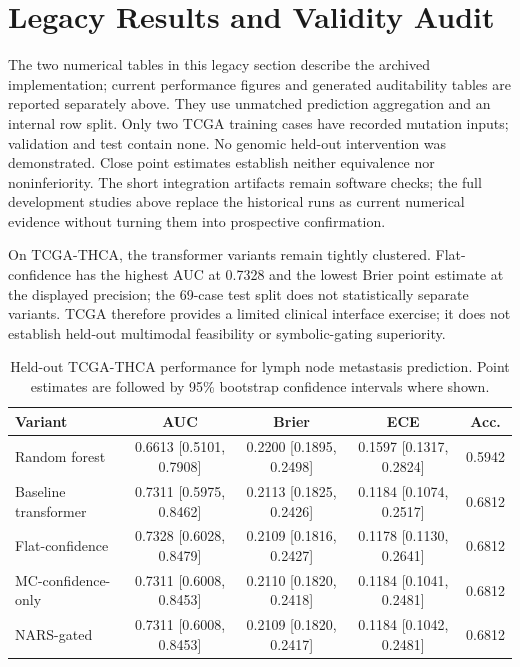 \section{Legacy Results and Validity Audit}
\label{sec:results}

The two numerical tables in this legacy section describe the archived implementation; current performance figures and generated auditability tables are reported separately above. They use unmatched prediction aggregation and an internal row split. Only two TCGA training cases have recorded mutation inputs; validation and test contain none. No genomic held-out intervention was demonstrated. Close point estimates establish neither equivalence nor noninferiority. The short integration artifacts remain software checks; the full development studies above replace the historical runs as current numerical evidence without turning them into prospective confirmation.

On TCGA-THCA, the transformer variants remain tightly clustered. Flat-confidence has the highest AUC at 0.7328 and the lowest Brier point estimate at the displayed precision; the 69-case test split does not statistically separate variants. TCGA therefore provides a limited clinical interface exercise; it does not establish held-out multimodal feasibility or symbolic-gating superiority.

\begin{table}[t]
\caption{Held-out TCGA-THCA performance for lymph node metastasis prediction. Point estimates are followed by 95\% bootstrap confidence intervals where shown.}
\label{tab:tcga_results}
\centering
\scriptsize
\setlength{\tabcolsep}{2.5pt}
\begin{tabular}{@{}lcccc@{}}
\toprule
Variant & AUC & Brier & ECE & Acc. \\
\midrule
Random forest & 0.6613 [0.5101, 0.7908] & 0.2200 [0.1895, 0.2498] & 0.1597 [0.1317, 0.2824] & 0.5942 \\
Baseline transformer & 0.7311 [0.5975, 0.8462] & 0.2113 [0.1825, 0.2426] & 0.1184 [0.1074, 0.2517] & 0.6812 \\
Flat-confidence & 0.7328 [0.6028, 0.8479] & 0.2109 [0.1816, 0.2427] & 0.1178 [0.1130, 0.2641] & 0.6812 \\
MC-confidence-only & 0.7311 [0.6008, 0.8453] & 0.2110 [0.1820, 0.2418] & 0.1184 [0.1041, 0.2481] & 0.6812 \\
NARS-gated & 0.7311 [0.6008, 0.8453] & 0.2109 [0.1820, 0.2417] & 0.1184 [0.1042, 0.2481] & 0.6812 \\
\bottomrule
\end{tabular}
\end{table}

